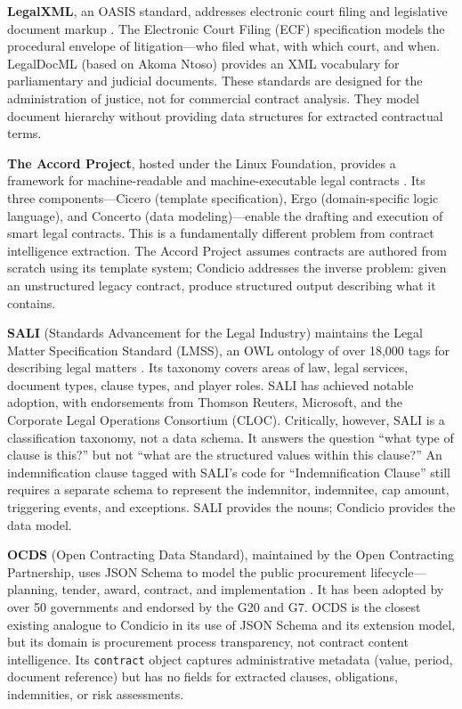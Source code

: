 \documentclass[11pt,a4paper]{article}
\begin{document}
\textbf{LegalXML}, an OASIS standard, addresses electronic court filing and legislative document markup \cite{legalxml}. The Electronic Court Filing (ECF) specification models the procedural envelope of litigation---who filed what, with which court, and when. LegalDocML (based on Akoma Ntoso) provides an XML vocabulary for parliamentary and judicial documents. These standards are designed for the administration of justice, not for commercial contract analysis. They model document hierarchy without providing data structures for extracted contractual terms.

\textbf{The Accord Project}, hosted under the Linux Foundation, provides a framework for machine-readable and machine-executable legal contracts \cite{accord}. Its three components---Cicero (template specification), Ergo (domain-specific logic language), and Concerto (data modeling)---enable the drafting and execution of smart legal contracts. This is a fundamentally different problem from contract intelligence extraction. The Accord Project assumes contracts are authored from scratch using its template system; Condicio addresses the inverse problem: given an unstructured legacy contract, produce structured output describing what it contains.

\textbf{SALI} (Standards Advancement for the Legal Industry) maintains the Legal Matter Specification Standard (LMSS), an OWL ontology of over 18,000 tags for describing legal matters \cite{sali}. Its taxonomy covers areas of law, legal services, document types, clause types, and player roles. SALI has achieved notable adoption, with endorsements from Thomson Reuters, Microsoft, and the Corporate Legal Operations Consortium (CLOC). Critically, however, SALI is a classification taxonomy, not a data schema. It answers the question ``what type of clause is this?'' but not ``what are the structured values within this clause?'' An indemnification clause tagged with SALI's code for ``Indemnification Clause'' still requires a separate schema to represent the indemnitor, indemnitee, cap amount, triggering events, and exceptions. SALI provides the nouns; Condicio provides the data model.

\textbf{OCDS} (Open Contracting Data Standard), maintained by the Open Contracting Partnership, uses JSON Schema to model the public procurement lifecycle---planning, tender, award, contract, and implementation \cite{ocds}. It has been adopted by over 50 governments and endorsed by the G20 and G7. OCDS is the closest existing analogue to Condicio in its use of JSON Schema and its extension model, but its domain is procurement process transparency, not contract content intelligence. Its \texttt{contract} object captures administrative metadata (value, period, document reference) but has no fields for extracted clauses, obligations, indemnities, or risk assessments.
\end{document}
